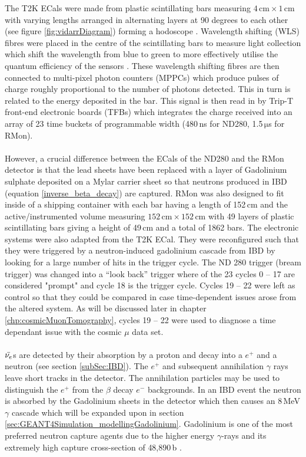The T2K ECals were made from plastic scintillating bars measuring $4\,\textrm{cm}\times1\,\textrm{cm}$ with varying lengths arranged in alternating layers at 90 degrees to each other (see figure \ref{fig:vidarrDiagram}) forming a hodoscope \cite{Allan_2013}. Wavelength shifting (WLS) fibres were placed in the centre of the scintillating bars to measure light collection which shift the wavelength from blue to green to more effectively utilise the quantum efficiency of the sensors \cite{Allan_2013}. These wavelength shifting fibres are then connected to multi-pixel photon counters (MPPCs) which produce pulses of charge roughly proportional to the number of photons detected. This in turn is related to the energy deposited in the bar. This signal is then read in by Trip-T front-end electronic boards (TFBs) which integrates the charge received into an array of 23 time buckets of programmable width (480\,ns for ND280, 1.5\,$\mathrm{\mu}$s for RMon). 
\\\\However, a crucial difference between the ECals of the ND280 and the RMon detector is that the lead sheets have been replaced with a layer of Gadolinium sulphate deposited on a Mylar carrier sheet so that neutrons produced in IBD (equation \ref{inverse_beta_decay}) are captured. RMon was also designed to fit inside of a shipping container with each bar having a length of 152\,cm and the active/instrumented volume measuring $152\,\textrm{cm}\times152\,\textrm{cm}$ with 49 layers of plastic scintillating bars giving a height of 49\,cm and a total of 1862 bars. The electronic systems were also adapted from the T2K ECal. They were reconfigured such that they were triggered by a neutron-induced gadolinium cascade from IBD by looking for a large number of hits in the trigger cycle. The ND 280 trigger (bream trigger) was changed into a ``look back'' trigger where of the 23 cycles 0 -- 17 are considered "prompt" and cycle 18 is the trigger cycle. Cycles 19 -- 22 were left as control so that they could be compared in case time-dependent issues arose from the altered system. As will be discussed later in chapter \ref{chp:cosmicMuonTomography}, cycles 19 -- 22 were used to diagnose a time dependant issue with the cosmic $\mu$ data set.
\\\\$\Bar{\nu_e}$s are detected by their absorption by a proton and decay into a $e^+$ and a neutron (see section \ref{subSec:IBD}). The $e^+$ and subsequent annihilation $\gamma$ rays leave short tracks in the detector. The annihilation particles may be used to distinguish the $e^+$ from the $\beta$ decay $e^-$ backgrounds. In an IBD event the neutron is absorbed by the Gadolinium sheets in the detector which then causes an 8\,MeV $\gamma$ cascade which will be expanded upon in section \ref{sec:GEANT4Simulation_modellingGadolinium}. Gadolinium is one of the most preferred neutron capture agents due to the higher energy $\gamma$-rays and its extremely high capture cross-section of 48,890\,b \cite{gadFoilsThermalNeut}. 

